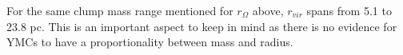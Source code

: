 For the same clump mass range mentioned for $r_Ω$ above, $r_{vir}$ spans from 5.1 to 23.8 pc. This is an important aspect to keep in mind as there is no evidence for YMCs to have a proportionality between mass and radius. \cite{Bedini_2013}\\
